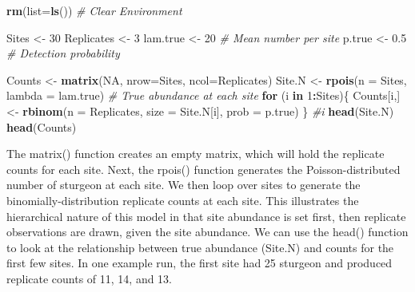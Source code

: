 \documentclass[
]{krantz}
\makeatletter
\newenvironment{Shaded}{\begin{snugshade}}{\end{snugshade}}
\newcommand{\AttributeTok}[1]{\textcolor[rgb]{0.27,0.27,0.27}{#1}}
\newcommand{\CommentTok}[1]{\textcolor[rgb]{0.37,0.37,0.37}{\textit{#1}}}
\newcommand{\ConstantTok}[1]{\textcolor[rgb]{0.37,0.37,0.37}{#1}}
\newcommand{\ControlFlowTok}[1]{\textcolor[rgb]{0.27,0.27,0.27}{\textbf{#1}}}
\newcommand{\DecValTok}[1]{\textcolor[rgb]{0.06,0.06,0.06}{#1}}
\newcommand{\FloatTok}[1]{\textcolor[rgb]{0.06,0.06,0.06}{#1}}
\newcommand{\FunctionTok}[1]{\textcolor[rgb]{0.27,0.27,0.27}{\textbf{#1}}}
\newcommand{\NormalTok}[1]{#1}
\newcommand{\OtherTok}[1]{\textcolor[rgb]{0.37,0.37,0.37}{#1}}
\newcommand{\SpecialCharTok}[1]{\textcolor[rgb]{0.43,0.43,0.43}{\textbf{#1}}}
\newenvironment{kframe}{%
\medskip{}
\setlength{\fboxsep}{.8em}
 \def\at@end@of@kframe{}%
 \ifinner\ifhmode%
  \def\at@end@of@kframe{\end{minipage}}%
  \begin{minipage}{\columnwidth}%
 \fi\fi%
 \def\FrameCommand##1{\hskip\@totalleftmargin \hskip-\fboxsep
 \colorbox{shadecolor}{##1}\hskip-\fboxsep
     \hskip-\linewidth \hskip-\@totalleftmargin \hskip\columnwidth}%
 \MakeFramed {\advance\hsize-\width
   \@totalleftmargin\z@ \linewidth\hsize
   \@setminipage}}%
 {\par\unskip\endMakeFramed%
 \at@end@of@kframe}
\renewenvironment{Shaded}{\begin{kframe}}{\end{kframe}}
\makeatother
\begin{document}
\begin{Shaded}
\begin{Highlighting}[]
\FunctionTok{rm}\NormalTok{(}\AttributeTok{list=}\FunctionTok{ls}\NormalTok{()) }\CommentTok{\# Clear Environment}

\NormalTok{Sites }\OtherTok{\textless{}{-}} \DecValTok{30}
\NormalTok{Replicates }\OtherTok{\textless{}{-}} \DecValTok{3}
\NormalTok{lam.true }\OtherTok{\textless{}{-}} \DecValTok{20} \CommentTok{\# Mean number per site}
\NormalTok{p.true }\OtherTok{\textless{}{-}} \FloatTok{0.5} \CommentTok{\# Detection probability}

\NormalTok{Counts }\OtherTok{\textless{}{-}} \FunctionTok{matrix}\NormalTok{(}\ConstantTok{NA}\NormalTok{, }\AttributeTok{nrow=}\NormalTok{Sites, }\AttributeTok{ncol=}\NormalTok{Replicates)}
\NormalTok{Site.N }\OtherTok{\textless{}{-}} \FunctionTok{rpois}\NormalTok{(}\AttributeTok{n =}\NormalTok{ Sites, }\AttributeTok{lambda =}\NormalTok{ lam.true) }\CommentTok{\# True abundance at each site}
\ControlFlowTok{for}\NormalTok{ (i }\ControlFlowTok{in} \DecValTok{1}\SpecialCharTok{:}\NormalTok{Sites)\{}
\NormalTok{  Counts[i,] }\OtherTok{\textless{}{-}} \FunctionTok{rbinom}\NormalTok{(}\AttributeTok{n =}\NormalTok{ Replicates, }\AttributeTok{size =}\NormalTok{ Site.N[i], }\AttributeTok{prob =}\NormalTok{ p.true)}
\NormalTok{  \} }\CommentTok{\#i}
\FunctionTok{head}\NormalTok{(Site.N)}
\FunctionTok{head}\NormalTok{(Counts)}
\end{Highlighting}
\end{Shaded}

The matrix() function creates an empty matrix, which will hold the replicate counts for each site. Next, the rpois() function generates the Poisson-distributed number of sturgeon at each site. We then loop over sites to generate the binomially-distribution replicate counts at each site. This illustrates the hierarchical nature of this model in that site abundance is set first, then replicate observations are drawn, given the site abundance. We can use the head() function to look at the relationship between true abundance (Site.N) and counts for the first few sites. In one example run, the first site had 25 sturgeon and produced replicate counts of 11, 14, and 13.
\end{document}
